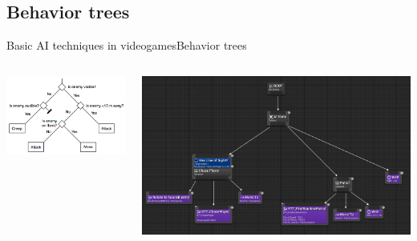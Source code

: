 \documentclass[10pt,compress]{beamer} %
\begin{document}
\subsection{Behavior trees}
\begin{frame}{Basic AI techniques in videogames}{Behavior trees}
   \begin{columns}
        \vspace{-0.2cm}
        \includegraphics[width=0.9\linewidth]{figs/tree4.png}
    
		\includegraphics[width=\linewidth]{figs/tree-unreal}
    \end{columns}
\end{frame}
\end{document}
